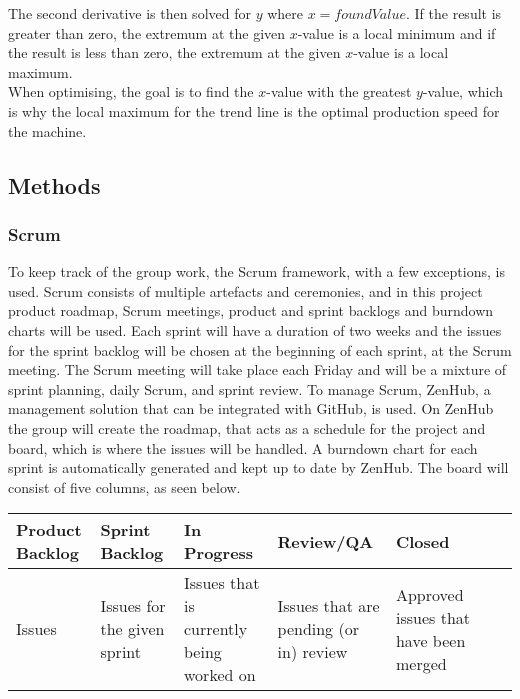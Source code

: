 The second derivative is then solved for \(y\) where \(x = found Value\). If the
result is greater than zero, the extremum at the given \(x\)-value is a local
minimum and if the result is less than zero, the extremum at the given 
\(x\)-value is a local maximum.\\ 

When optimising, the goal is to find the \(x\)-value with the greatest
\(y\)-value, which is why the local maximum for the trend line is the optimal
production speed for the machine.


\subsection{Methods}
\subsubsection{Scrum}
To keep track of the group work, the Scrum framework, with a few exceptions, is
used. Scrum consists of multiple artefacts and ceremonies, and in this project
product roadmap, Scrum meetings, product and sprint backlogs and burndown charts
will be used. Each sprint will have a duration of two weeks and the issues for
the sprint backlog will be chosen at the beginning of each sprint, at the Scrum
meeting. The Scrum meeting will take place each Friday and will be a mixture of
sprint planning, daily Scrum, and sprint review. To manage Scrum, ZenHub, a
management solution that can be integrated with GitHub, is used. On ZenHub the
group will create the roadmap, that acts as a schedule for the project and
board, which is where the issues will be handled. A burndown chart for each
sprint is automatically generated and kept up to date by ZenHub. The board will
consist of five columns, as seen below.

\begin{table}[H]
    \begin{tabularx}{\textwidth}{|>{\RaggedRight}X|>{\RaggedRight}X|>{\RaggedRight}X|>{\RaggedRight}X|>{\RaggedRight}X|>{\RaggedRight}X|>{\RaggedRight}X|}
        \hline                             
        \textbf{Product Backlog} & \textbf{Sprint Backlog} & \textbf{In Progress} & \textbf{Review/QA} & \textbf{Closed} \\
        \hline
        Issues & Issues for the given sprint & Issues that is currently being worked on & Issues that are pending (or in) review & Approved issues that have been merged    \\
        \hline
    \end{tabularx}
    \label{table:scrum}
\end{table} 

